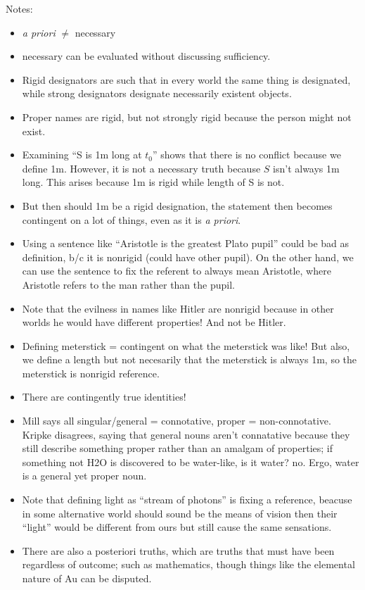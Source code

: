 \documentclass{report}
\begin{document}
Notes:
\begin{itemize}
\item \emph{a priori} $\neq$ necessary
\item necessary can be evaluated without discussing sufficiency.
\item Rigid designators are such that in every world the same thing is designated, while strong designators designate necessarily existent objects.
\item Proper names are rigid, but not strongly rigid because the person might not exist.
\item Examining ``S is 1m long at $t_0$'' shows that there is no conflict because we define 1m. However, it is not a necessary truth because $S$ isn't always 1m long. This arises because 1m is rigid while length of S is not. 
\item But then should 1m be a rigid designation, the statement then becomes contingent on a lot of things, even as it is \emph{a priori}. 
\item Using a sentence like ``Aristotle is the greatest Plato pupil'' could be bad as definition, b/c it is nonrigid (could have other pupil). On the other hand, we can use the sentence to fix the referent to always mean Aristotle, where Aristotle refers to the man rather than the pupil.
\item Note that the evilness in names like Hitler are nonrigid because in other worlds he would have different properties! And not be Hitler.
\item Defining meterstick = contingent on what the meterstick was like! But also, we define a length but not necesarily that the meterstick is always 1m, so the meterstick is nonrigid reference.
\item There are contingently true identities!
\item Mill says all singular/general = connotative, proper = non-connotative. Kripke disagrees, saying that general nouns aren't connatative because they still describe something proper rather than an amalgam of properties; if something not H2O is discovered to be water-like, is it water? no. Ergo, water is a general yet proper noun.
\item Note that defining light as ``stream of photons'' is fixing a reference, beacuse in some alternative world should sound be the means of vision then	their ``light'' would be different from ours but still cause the same sensations.
\item There are also a posteriori truths, which are truths that must have been regardless of outcome; such as mathematics, though things like the elemental nature of Au can be disputed.

\end{itemize}
\end{document}

